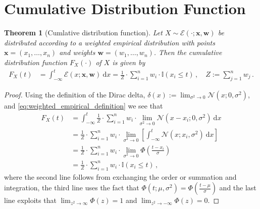 \documentclass[a4paper]{article}
\newcommand{\Normal}[3]{{\mathcal N} \left({#1};{#2},{#3}\right)}
\newcommand{\NormalCDF}[3]{\Phi \left({#1};{#2},{#3}\right)}
\newcommand{\NormalStandardCDF}[1]{\Phi \left({#1}\right)}
\newcommand{\WeightedEmpirical}[3]{{\mathcal E} \left({#1};{#2},{#3}\right)}
\newcommand{\dirac}[1]{{\delta \left( {#1} \right)}}
\newcommand{\identity}[1]{{{\mathbb{I}} \left( {#1} \right)}}
\newcommand{\intd}[1]{\ \mathrm{d}{#1}}
\newcommand{\bs}[1]{\boldsymbol{#1}}
\newtheorem{theorem}{Theorem}
\theoremstyle{definition}
\begin{document}
\section*{Cumulative Distribution Function}
\begin{theorem}[Cumlative distribution function] Let $X \sim \WeightedEmpirical{\cdot}{\bs{x}}{\bs{w}}$ be distributed according to a weighted empirical distribution with points $\bs{x} = \left(x_1,\ldots,x_n\right)$ and weights $\bs{w} = \left(w_1,\ldots,w_n\right)$. Then the cumulative distribution function $F_X\left(\cdot\right)$ of $X$ is given by
    \begin{align}
        F_X\left(t\right) & = \int_{-\infty}^t \WeightedEmpirical{x}{\bs{x}}{\bs{w}}\intd{x} = \frac{1}{Z} \cdot \sum_{i=1}^n w_i \cdot \identity{x_i \leq t} \,, \quad Z := \sum_{j=1}^n w_j \,.
    \end{align}
\end{theorem}
\begin{proof}
    Using the definition of the Dirac delta, $\dirac{x} := \lim_{\sigma^2 \rightarrow 0} \Normal{x}{0}{\sigma^2}$, and \eqref{eq:weighted_empirical_definition} we see that 
    \begin{align*}
        F_X\left(t\right) & = \int_{-\infty}^t \frac{1}{Z} \cdot \sum_{i=1}^n w_i \cdot \lim_{\sigma^2 \rightarrow 0} \Normal{x - x_i}{0}{\sigma^2} \intd{x} \\
        & = \frac{1}{Z} \cdot \sum_{i=1}^n w_i \cdot \lim_{\sigma^2 \rightarrow 0} \left[ \int_{-\infty}^t \Normal{x}{x_i}{\sigma^2} \intd{x} \right] \\
        & = \frac{1}{Z} \cdot \sum_{i=1}^n w_i \cdot \lim_{\sigma^2 \rightarrow 0} \NormalStandardCDF{\frac{t - x_i}{\sigma}} \\
        & = \frac{1}{Z} \cdot \sum_{i=1}^n w_i \cdot \identity{x_i \leq t} \,,
    \end{align*}
    where the second line follows from exchanging the order or summation and integration, the third line uses the fact that $\NormalCDF{t}{\mu}{\sigma^2} = \NormalStandardCDF{\frac{t-\mu}{\sigma}}$ and the last line exploits that $\lim_{z^2\rightarrow\infty} \NormalStandardCDF{z} = 1$ and $\lim_{z^2\rightarrow-\infty} \NormalStandardCDF{z} = 0$.
\end{proof}
\end{document}
